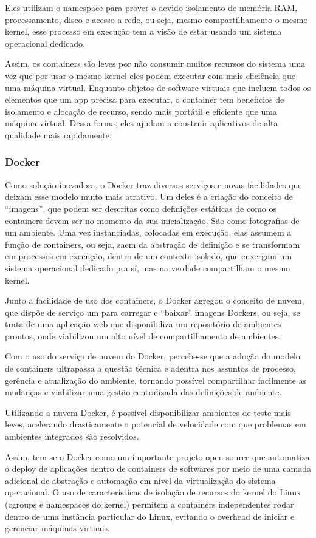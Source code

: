 Eles utilizam o namespace para prover o devido isolamento de memória RAM,
processamento, disco e acesso a rede, ou seja, mesmo compartilhamento o
mesmo kernel, esse processo em execução tem a visão de estar usando um
sistema operacional dedicado.

Assim, os containers são leves por não consumir muitos recursos do
sistema uma vez que por usar o mesmo kernel eles podem executar com
mais eficiência que uma máquina virtual. Enquanto objetos de software
virtuais que incluem todos os elementos que um app precisa para executar,
o container tem benefícios de isolamento e alocação de recurso, sendo
mais portátil e eficiente que uma máquina virtual. Dessa forma, eles
ajudam a construir aplicativos de alta qualidade mais rapidamente.

\subsubsection{Docker}
Como solução inovadora, o Docker traz diversos serviços e novas
facilidades que deixam esse modelo muito mais atrativo. Um deles
é a criação do conceito de “imagens”, que podem ser descritas como
definições estáticas de como os containers devem ser no momento da
sua inicialização. São como fotografias de um ambiente. Uma vez
instanciadas, colocadas em execução, elas assumem a função de
containers, ou seja, saem da abstração de definição e se transformam
em processos em execução, dentro de um contexto isolado, que
enxergam um sistema operacional dedicado pra sí, mas na verdade
compartilham o mesmo kernel.

Junto a facilidade de uso dos containers, o Docker agregou o
conceito de nuvem, que dispõe de serviço um para carregar e
“baixar” imagens Dockers, ou seja, se trata de uma aplicação
web que disponibiliza um repositório de ambientes prontos,
onde viabilizou um alto nível de compartilhamento de ambientes.

Com o uso do serviço de nuvem do Docker, percebe-se que a
adoção do modelo de containers ultrapassa a questão técnica
e adentra nos assuntos de processo, gerência e atualização
do ambiente, tornando possível compartilhar facilmente as
mudanças e viabilizar uma gestão centralizada das definições
de ambiente.

Utilizando a nuvem Docker, é possível disponibilizar ambientes de
teste mais leves, acelerando drasticamente o potencial de velocidade
com que problemas em ambientes integrados são resolvidos.

Assim, tem-se o Docker como um importante projeto open-source
que automatiza o deploy de aplicações dentro de containers de
softwares por meio de uma camada adicional de abstração e automação
em nível da virtualização do sistema operacional. O uso de
características de isolação de recursos do kernel do Linux
(cgroups e namespaces do kernel) permitem a containers
independentes rodar dentro de uma instância particular do Linux,
evitando o overhead de iniciar e gerenciar máquinas virtuais.
